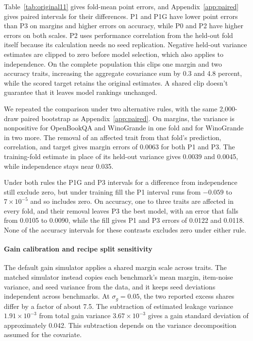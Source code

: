 Table~\ref{tab:original11} gives fold-mean point errors, and Appendix~\ref{app:paired} gives paired intervals for their differences. P1 and P1G have lower point errors than P3 on margins and higher errors on accuracy, while P0 and P2 have higher errors on both scales. P2 uses performance correlation from the held-out fold itself because its calculation needs no seed replication. Negative held-out variance estimates are clipped to zero before model selection, which also applies to independence. On the complete population this clips one margin and two accuracy traits, increasing the aggregate covariance sum by 0.3 and 4.8 percent, while the scored target retains the original estimates. A shared clip doesn't guarantee that it leaves model rankings unchanged.

We repeated the comparison under two alternative rules, with the same 2,000-draw paired bootstrap as Appendix~\ref{app:paired}. On margins, the variance is nonpositive for OpenBookQA and WinoGrande in one fold and for WinoGrande in two more. The removal of an affected trait from that fold's prediction, correlation, and target gives margin errors of 0.0063 for both P1 and P3. The training-fold estimate in place of its held-out variance gives 0.0039 and 0.0045, while independence stays near 0.035.

Under both rules the P1G and P3 intervals for a difference from independence still exclude zero, but under training fill the P1 interval runs from $-0.059$ to $7\times10^{-5}$ and so includes zero. On accuracy, one to three traits are affected in every fold, and their removal leaves P3 the best model, with an error that falls from 0.0105 to 0.0090, while the fill gives P1 and P3 errors of 0.0122 and 0.0118. None of the accuracy intervals for these contrasts excludes zero under either rule.


\paragraph{Gain calibration and recipe split sensitivity}
The default gain simulator applies a shared margin scale across traits. The matched simulator instead copies each benchmark's mean margin, item-noise variance, and seed variance from the data, and it keeps seed deviations independent across benchmarks. At $\sigma_g=0.05$, the two reported excess shares differ by a factor of about 7.5. The subtraction of estimated leakage variance $1.91\times10^{-3}$ from total gain variance $3.67\times10^{-3}$ gives a gain standard deviation of approximately 0.042. This subtraction depends on the variance decomposition assumed for the covariate.

